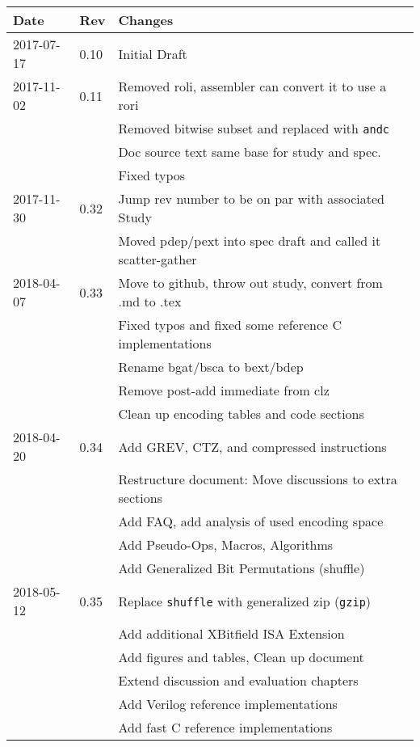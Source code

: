\documentclass[twoside,11pt]{book}
\begin{document}
\begin{center}
\begin{tabular}{lll}
Date & Rev & Changes \\
\hline
2017-07-17 & 0.10 & Initial Draft \\
2017-11-02 & 0.11 & Removed roli, assembler can convert it to use a rori \\
           &      & Removed bitwise subset and replaced with \texttt{andc} \\
           &      & Doc source text same base for study and spec. \\
           &      & Fixed typos \\
2017-11-30 & 0.32 & Jump rev number to be on par with associated Study \\
           &      & Moved pdep/pext into spec draft and called it scatter-gather \\
2018-04-07 & 0.33 & Move to github, throw out study, convert from .md to .tex \\
           &      & Fixed typos and fixed some reference C implementations \\
           &      & Rename bgat/bsca to bext/bdep \\
           &      & Remove post-add immediate from clz \\
           &      & Clean up encoding tables and code sections \\
2018-04-20 & 0.34 & Add GREV, CTZ, and compressed instructions \\
           &      & Restructure document: Move discussions to extra sections \\
           &      & Add FAQ, add analysis of used encoding space \\
           &      & Add Pseudo-Ops, Macros, Algorithms \\
           &      & Add Generalized Bit Permutations (shuffle) \\
2018-05-12 & 0.35 & Replace {\tt shuffle} with generalized zip ({\tt gzip}) \\
           &      & Add additional XBitfield ISA Extension \\
           &      & Add figures and tables, Clean up document \\
           &      & Extend discussion and evaluation chapters \\
           &      & Add Verilog reference implementations \\
           &      & Add fast C reference implementations \\

\end{tabular}
\end{center}
\end{document}
